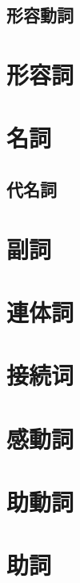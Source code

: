 \newpage

\subsection{形容動詞}

\newpage

\section{形容詞}

\newpage

\section{名詞}

\newpage

\subsection{代名詞}

\newpage

\section{副詞}

\newpage

\section{連体詞}

\newpage

\section{接続词}

\newpage

\section{感動詞}

\newpage

\section{助動詞}

\newpage

\section{助詞}


\newpage